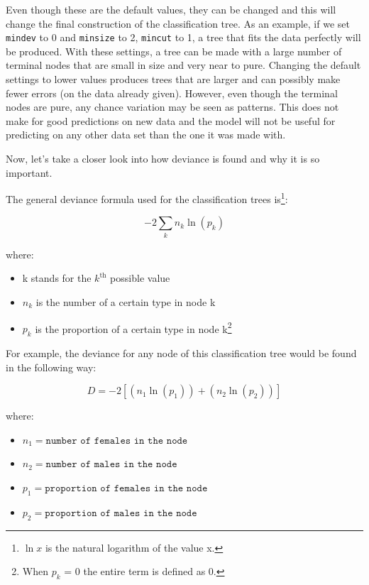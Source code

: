 \documentclass[12pt,twoside]{reedthesis}
\providecommand{\tightlist}{%
  \setlength{\itemsep}{0pt}\setlength{\parskip}{0pt}}
\begin{document}
  Even though these are the default values, they can be changed and this
  will change the final construction of the classification tree. As an
  example, if we set \texttt{mindev} to 0 and \texttt{minsize} to 2,
  \texttt{mincut} to 1, a tree that fits the data perfectly will be
  produced. With these settings, a tree can be made with a large number of
  terminal nodes that are small in size and very near to pure. Changing
  the default settings to lower values produces trees that are larger and
  can possibly make fewer errors (on the data already given). However,
  even though the terminal nodes are pure, any chance variation may be
  seen as patterns. This does not make for good predictions on new data
  and the model will not be useful for predicting on any other data set
  than the one it was made with.
  
  Now, let's take a closer look into how deviance is found and why it is
  so important.
  
  The general deviance formula used for the classification trees
  is\footnote{\(\ln{x}\) is the natural logarithm of the value x.}:
  
  \[-2 \sum_{k}n_{k}\ln(p_{k})\]
  
  where:
  
  \begin{itemize}
  \tightlist
  \item
    k stands for the \(k^{\text{th}}\) possible value
  \item
    \(n_{k}\) is the number of a certain type in node k\\
  \item
    \(p_{k}\) is the proportion of a certain type in node k\footnote{When
      \(p_{k}\) = 0 the entire term is defined as 0.}
  \end{itemize}
  
  For example, the deviance for any node of this classification tree would
  be found in the following way:
  
  \[D = -2[(n_{1}\ln(p_{1})) + (n_{2}\ln(p_{2}))]\]
  
  where:
  
  \begin{itemize}
  \tightlist
  \item
    \(n_{1} = \texttt{number of females in the node}\)
  \item
    \(n_{2} = \texttt{number of males in the node}\)
  \item
    \(p_{1} = \texttt{proportion of females in the node}\)
  \item
    \(p_{2} = \texttt{proportion of males in the node}\)
  \end{itemize}
  
\end{document}

